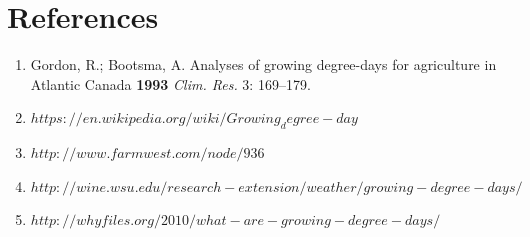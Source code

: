\documentclass{article}
\begin{document}
\section{References}
%
\begin{enumerate}
\item Gordon, R.; Bootsma, A. Analyses of growing degree-days for agriculture in Atlantic Canada \textbf{1993} \textit{Clim. Res.} 3: 169--179.
\item \href{url}{$https://en.wikipedia.org/wiki/Growing_degree-day$}
\item \href{url}{$http://www.farmwest.com/node/936$}
\item \href{url}{$http://wine.wsu.edu/research-extension/weather/growing-degree-days/$}
\item \href{url}{$http://whyfiles.org/2010/what-are-growing-degree-days/$}
\end{enumerate}

%



\end{document}

